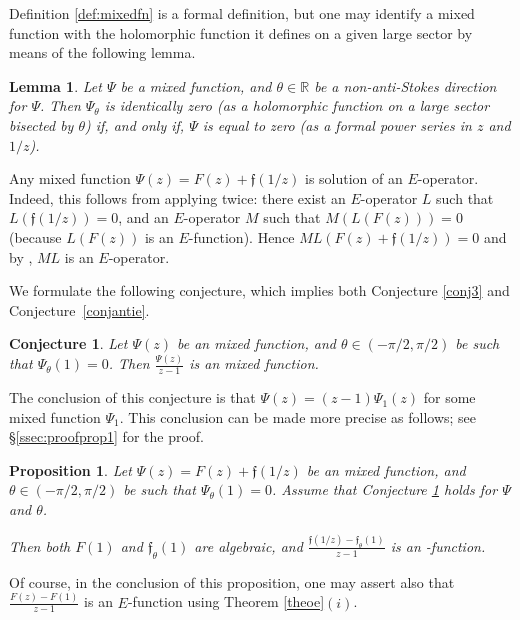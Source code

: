 \documentclass[reqno,12pt]{article}
\numberwithin{equation}{section}
\newtheorem{conj}{Conjecture}
\newtheorem{prop}{Proposition}
\newtheorem{lem}{Lemma}
\theoremstyle{remark}
\newcommand{\R}{\mathbb{R}}
\newcommand{\tantie}{{\fontencoding{OT2}\fontfamily{wncyr}\selectfont\CYREREV}}
\newcommand{\antie}{\text{\tantie}}
\newcommand{\fgo}{\mathfrak{f}}
\begin{document}
\medskip

Definition \ref{def:mixedfn} is a formal definition, but one may identify a mixed function with the holomorphic function it defines on a given large sector by means of the following lemma.

\begin{lem} \label{lemunicite} Let $\Psi$ be a mixed function, and $\theta\in\R$ be a non-anti-Stokes direction for $\Psi$. Then $\Psi_\theta$ is identically zero (as a holomorphic function on a large sector bisected by $\theta$) if, and only if, $\Psi$ is equal to zero (as a formal power series in $z$ and $1/z$).
\end{lem}



\medskip

Any mixed function $\Psi(z) = F(z)+\fgo(1/z)$ is solution of an $E$-operator. Indeed, 
this follows from applying \cite[Theorem 6.1]{andre}  twice: 
there exist   an $E$-operator $L$ such that $L( \fgo (1/z))=0$, and
an $E$-operator $M$ such that $M(L(F(z)))=0$ (because   $L(F(z))$ is an $E$-function). Hence $ML(F(z)+\fgo(1/z))=0$ and
 by \cite[p. 720, \S 4.1]{andre}, $ML$ is an $E$-operator.

\medskip

We formulate the following  conjecture, which implies both Conjecture \ref{conj3} and Conjecture~\ref{conjantie}.

\begin{conj}\label{conj1} Let $\Psi(z) $ be an mixed function, and $\theta\in (-\pi/2,\pi/2)$ be such that $\Psi_\theta(1)=0$.
Then $\frac{\Psi(z)}{z-1}$ is an mixed function.
\end{conj}

The conclusion of this conjecture is that $\Psi(z) = (z-1)   \Psi_1(z)$ for some mixed function $  \Psi_1$. This conclusion can be made more precise as follows; see \S\ref{ssec:proofprop1} for the proof.


\begin{prop}\label{prop1} Let $\Psi(z) = F(z)+\fgo(1/z)$ be an mixed function, and $\theta\in (-\pi/2,\pi/2)$ be such that $\Psi_\theta(1)=0$.
Assume that Conjecture \ref{conj1} holds for $\Psi$ and $\theta$. 

Then both $F(1)$ and $\fgo_\theta(1)$ are algebraic, and $\frac{  \fgo(1/z)  - \fgo_\theta(1) }{z-1} $ is an \antie-function.
\end{prop}
Of course, in the conclusion of this proposition, one may assert also that $\frac{  F(z)  -F(1) }{z-1} $  is an $E$-function using Theorem \ref{theoe}$(i)$.
\end{document}
